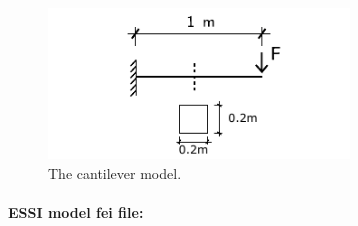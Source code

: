 \documentclass[fleqn,11pt]{article}
\begin{document}
% 
% 
% 
% 
\begin{figure}[!htb]
  \centering
  \includegraphics[width=8cm]{../Figure-files/_Chapter_Appendix_Illustrative_Examples/cantilever.pdf}
  \caption{The cantilever model.}
  \label{fig_cantilev_1}
\end{figure}


\paragraph{ESSI model fei file: } ~
\end{document}
